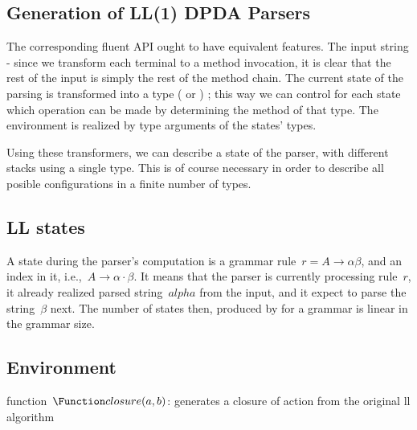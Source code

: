 \subsection{Generation of LL(1) DPDA Parsers}
\label{section:generation}
The corresponding \Java fluent API ought to have equivalent features.
The input string - since we transform each
  terminal to a method invocation, it is clear that the rest of the input is
  simply the rest of the method chain.
The current state of the parsing is transformed into a \Java type
  ( or ) ; this way we can control for each state
  which operation can be made by determining the method of that type.
The environment is realized by type arguments of the states' \Java types.

Using these transformers, we can describe a state of the parser,
  with different stacks using a single type.
This is of course necessary in order to describe all posible configurations
  in a finite number of \Java types.

%
\subsection{LL states}
A state during the parser's computation is a grammar rule~$r = A→αβ$, and an
index in it, i.e.,~$A→α·β$.
It means that the parser is currently processing rule~$r$, it already realized parsed string~$alpha$
  from the input, and it expect to parse the string~$β$ next.
The number of states then, produced by \Fajita for a grammar is linear in the grammar size.

\subsection{Environment}

\begin{algorithm}[p]
  \caption{\label{algorithm:llclosure}
  function~$\Function closure(a,b)$: generates a closure of action from the original ll algorithm}
  \begin{algorithmic}
    \FI
      \ELSE[$x$ must be~$b$]
        \BREAK
      \FI
    \DONE
  \end{algorithmic}
\end{algorithm}

